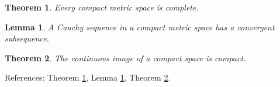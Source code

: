 \documentclass{article}
\newtheorem{theorem}{Theorem}
\newtheorem{lemma}[lemma]{Lemma}
\begin{document}
\begin{theorem}\label{thm:first}
Every compact metric space is complete.
\end{theorem}

\begin{lemma}\label{lem:cauchy}
A Cauchy sequence in a compact metric space has a convergent subsequence.
\end{lemma}

\begin{theorem}\label{thm:second}
The continuous image of a compact space is compact.
\end{theorem}

References:
Theorem \ref{thm:first},
Lemma \ref{lem:cauchy},
Theorem \ref{thm:second}.
\end{document}

